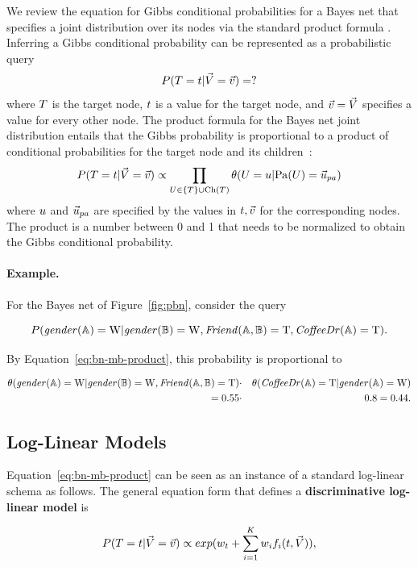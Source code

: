 \documentclass[twoside,11pt]{article}
\newcommand{\strongpoint}[1]{\paragraph{#1.}}
\begin{document}
We review the equation for Gibbs conditional probabilities for a Bayes net that specifies a joint distribution over its nodes via the standard product formula \cite{Pearl1988}. 
Inferring a Gibbs conditional probability can be represented as a probabilistic query
$$P(T = t | \vec{V} = \vec{v}) = ?$$
\noindent where $T$ is the target node, $t$ is a value for the target node, and $\vec{v} = \vec{V}$ specifies a value for every other node. The product formula for the Bayes net joint distribution entails that the Gibbs probability is proportional to a product of conditional probabilities for the target node and its children~\cite[Ch.14.5.2]{Russell2010}:  
\begin{equation} \label{eq:bn-mb-product}
\Gprob{\TT = \TV} {\VF = \VTuple} \propto \prod_{\UT \in \{\TT\} \cup \Ch{\TT}} \cprob{\UT = \UV}{\Pa{\UT} = \Prange{\UT}}
\end{equation}
where $u$ and $\Prange{\UT}$ are specified by the values in $t,\vec{v}$ for the corresponding nodes. The product is a number between 0 and 1 that needs to be normalized to obtain the Gibbs conditional probability.

\strongpoint{Example} For the Bayes net of Figure~\ref{fig:pbn}, consider the query

$$P(\it{gender}(\mathbb{A}) = \mathrm{W} | \it{gender}(\mathbb{B}) = \mathrm{W}, \it{Friend}(\mathbb{A},\mathbb{B}) = \mathrm{T}, \it{CoffeeDr}(\mathbb{A}) = \mathrm{T}).$$

\noindent By Equation~\ref{eq:bn-mb-product}, this probability is proportional to 

\begin{eqnarray*}
\theta(\it{gender}(\mathbb{A}) = \mathrm{W}|\it{gender}(\mathbb{B}) = \mathrm{W}, \it{Friend}(\mathbb{A},\mathbb{B}) = \mathrm{T}) & \cdot & \theta(\it{CoffeeDr}(\mathbb{A}) = \mathrm{T}|\it{gender}(\mathbb{A}) = \mathrm{W}) \\
= 0.55 &\cdot &0.8 = 0.44.
\end{eqnarray*}


\subsection{Log-Linear Models}

Equation~\ref{eq:bn-mb-product} can be seen as an instance of a standard log-linear schema as follows. The general equation form that defines a \textbf{discriminative log-linear model} \cite[Sec.4.2.2.1]{Sutton2007} is 

\begin{equation} \label{eq:log-linear}
P(T = t | \vec{V} = \vec{v}) \propto exp(w_{t} + \sum_{i=1}^{K} w_{i} f_{i}(t,\vec{V})),
\end{equation}
\end{document}
